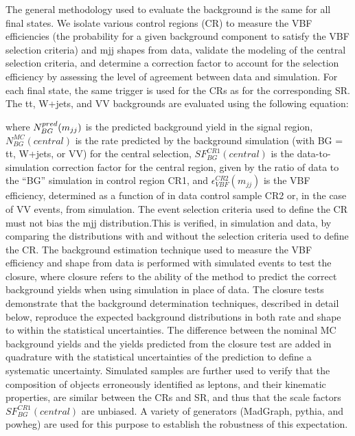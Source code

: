 The general methodology used to evaluate the background is the same for all final states. We isolate various control regions (CR) to measure the VBF efficiencies (the probability for a given background component to satisfy the VBF selection criteria) and mjj shapes from data, validate the modeling of the central selection criteria, and determine a correction factor to account for the selection efficiency by assessing the level of agreement between data and simulation. For each final state, the same trigger is used for the CRs as for the corresponding SR.  The tt, W+jets, and VV backgrounds are evaluated using the following equation:



where $N^{pred}_{BG}(m_{jj})$ is the predicted background yield in the signal region, $N^{MC}_{BG}(central)$ is the rate predicted by the background simulation (with BG = tt, W+jets, or VV) for the central
selection, $SF^{CR1}_{BG}(central)$ is the data-to-simulation correction factor for the central region, given by the ratio of data to the “BG” simulation in control region CR1, and $\epsilon^{CR2}_{VBF}(m_{jj})$  is the VBF efficiency, determined as a function of \mjj in data control sample CR2 or, in the case of VV events, from simulation. 
The event selection criteria used to define the CR must not bias the mjj distribution.This is verified, in simulation and data, by comparing the \mjj distributions with and without the selection criteria used to define the CR. The background estimation technique used to measure the VBF efficiency and \mjj shape from data is performed with simulated events to test the closure, where closure refers to the ability of the method to predict the correct background yields when using simulation in place of data. The closure tests demonstrate that the background determination techniques, described in detail below, reproduce the expected background distributions in both rate and shape to within the statistical uncertainties. The difference between the nominal MC background yields and the yields predicted from the closure test are added in quadrature with the statistical uncertainties of the prediction to define a systematic uncertainty. Simulated samples are further used to verify that the composition of objects erroneously identified as leptons, and their kinematic properties, are similar between the CRs and SR, and thus that the scale factors $SF^{CR1}_{BG}(central)$ are unbiased. A variety of generators (MadGraph, pythia, and powheg) are used for this purpose to establish the robustness of this expectation. 
